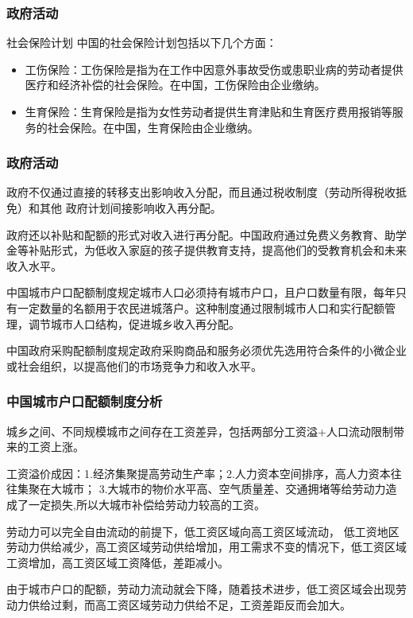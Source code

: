 \documentclass[aspectratio=169, 12pt]{beamer}
\begin{document}
\begin{frame}[plain]
    \frametitle{政府活动}
    \begin{block}{社会保险计划}
        中国的社会保险计划包括以下几个方面：
        \begin{itemize}
            \item 工伤保险：工伤保险是指为在工作中因意外事故受伤或患职业病的劳动者提供医疗和经济补偿的社会保险。在中国，工伤保险由企业缴纳。
            \item 生育保险：生育保险是指为女性劳动者提供生育津贴和生育医疗费用报销等服务的社会保险。在中国，生育保险由企业缴纳。
        \end{itemize}
    \end{block}
\end{frame}

\begin{frame}[plain]
    \frametitle{政府活动}
        政府不仅通过直接的转移支出影响收入分配，而且通过税收制度（劳动所得税收抵免）和其他
        政府计划间接影响收入再分配。\par
    政府还以补贴和配额的形式对收入进行再分配。中国政府通过免费义务教育、助学金等补贴形式，为低收入家庭的孩子提供教育支持，提高他们的受教育机会和未来收入水平。
    \par
    中国城市户口配额制度规定城市人口必须持有城市户口，且户口数量有限，每年只有一定数量的名额用于农民进城落户。这种制度通过限制城市人口和实行配额管理，调节城市人口结构，促进城乡收入再分配。
    \par
    中国政府采购配额制度规定政府采购商品和服务必须优先选用符合条件的小微企业或社会组织，以提高他们的市场竞争力和收入水平。
\end{frame}

\begin{frame}[plain]
    \frametitle{中国城市户口配额制度分析}
        城乡之间、不同规模城市之间存在工资差异，包括两部分工资溢+人口流动限制带来的工资上涨。
        \par
        工资溢价成因：1.经济集聚提高劳动生产率；2.人力资本空间排序，高人力资本往往集聚在大城市；
        3.大城市的物价水平高、空气质量差、交通拥堵等给劳动力造成了一定损失,所以大城市补偿给劳动力较高的工资。
        \par
        劳动力可以完全自由流动的前提下，低工资区域向高工资区域流动，
        低工资地区劳动力供给减少，高工资区域劳动供给增加，用工需求不变的情况下，低工资区域工资增加，高工资区域工资降低，差距减小。
        \par
        由于城市户口的配额，劳动力流动就会下降，随着技术进步，低工资区域会出现劳动力供给过剩，而高工资区域劳动力供给不足，工资差距反而会加大。
\end{frame}
\end{document}
